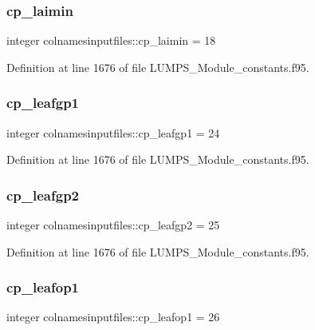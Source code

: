 \subsubsection{\texorpdfstring{cp\+\_\+laimin}{cp\_laimin}}
{\footnotesize\ttfamily integer colnamesinputfiles\+::cp\+\_\+laimin = 18}



Definition at line 1676 of file L\+U\+M\+P\+S\+\_\+\+Module\+\_\+constants.\+f95.

\mbox{\label{namespacecolnamesinputfiles_a159509b5d3aebdce404c1d633c77cc54}} 
\subsubsection{\texorpdfstring{cp\+\_\+leafgp1}{cp\_leafgp1}}
{\footnotesize\ttfamily integer colnamesinputfiles\+::cp\+\_\+leafgp1 = 24}



Definition at line 1676 of file L\+U\+M\+P\+S\+\_\+\+Module\+\_\+constants.\+f95.

\mbox{\label{namespacecolnamesinputfiles_a394613531ccbb0e41502c17f17435c8b}} 
\subsubsection{\texorpdfstring{cp\+\_\+leafgp2}{cp\_leafgp2}}
{\footnotesize\ttfamily integer colnamesinputfiles\+::cp\+\_\+leafgp2 = 25}



Definition at line 1676 of file L\+U\+M\+P\+S\+\_\+\+Module\+\_\+constants.\+f95.

\mbox{\label{namespacecolnamesinputfiles_a67a5fa87c0166fbdc3010b66754ebe05}} 
\subsubsection{\texorpdfstring{cp\+\_\+leafop1}{cp\_leafop1}}
{\footnotesize\ttfamily integer colnamesinputfiles\+::cp\+\_\+leafop1 = 26}



